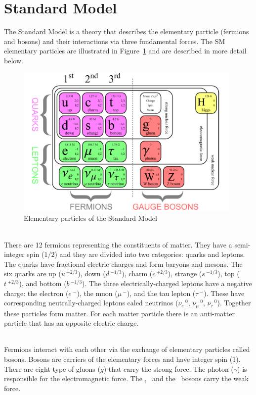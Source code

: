 \section{Standard Model}
\label{sec:StandardModel}

The Standard Model is a theory that describes the elementary particle (fermions and bosons) and their interactions via three fundamental forces. The SM elementary particles are illustrated in Figure~\ref{fig:SMParticles} and are described in more detail below.

\begin{figure}[!htb]
  \centering
  \includegraphics[width=0.98\textwidth]{./plots/SM.png}
  \caption{Elementary particles of the Standard Model}
  \label{fig:SMParticles}
\end{figure}

\ \\There are 12 fermions representing the constituents of matter. They have a semi-integer spin ($1/2$) and they are divided into two categories: quarks and leptons. The quarks have fractional electric charges and form baryons and mesons. The six quarks are up ($u\,^{+2/3}$), down ($d\,^{-1/3}$), charm ($c\,^{+2/3}$), strange ($s\,^{-1/3}$), top ($t\,^{+2/3}$), and bottom ($b\,^{-1/3}$). The three electrically-charged leptons have a negative charge: the electron ($e\,^{-}$), the muon ($\mu\,^{-}$), and the tau lepton ($\tau\,^{-}$). These have corresponding neutrally-charged leptons caled neutrinos ($\nu_e\,^0$, $\nu_\mu\,^0$, $\nu_\tau\,^0$). Together these particles form matter. For each matter particle there is an anti-matter particle that has an opposite electric charge. 

\ \\Fermions interact with each other via the exchange of elementary particles called bosons. Bosons are carriers of the elementary forces and have integer spin ($1$). There are eight type of gluons ($g$) that carry the strong force. The photon ($\gamma$) is responsible for the electromagnetic force. The \Wplus, \Wminus~and the \Zzero~bosons carry the weak force. 

